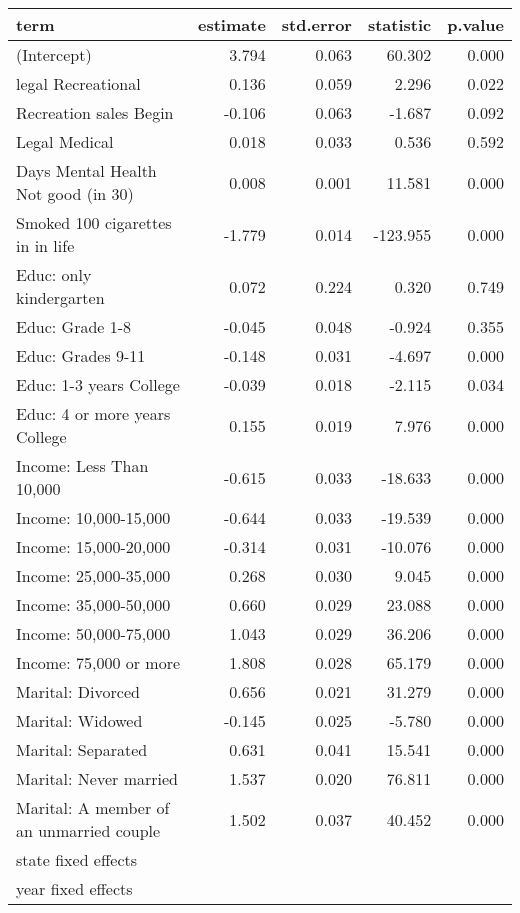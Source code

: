 \begin{tabular}{lrrrr}
  \hline
term & estimate & std.error & statistic & p.value \\ 
  \hline
(Intercept) & 3.794 & 0.063 & 60.302 & 0.000 \\ 
  legal Recreational & 0.136 & 0.059 & 2.296 & 0.022 \\ 
  Recreation sales Begin & -0.106 & 0.063 & -1.687 & 0.092 \\ 
  Legal Medical & 0.018 & 0.033 & 0.536 & 0.592 \\ 
  Days Mental Health Not good (in 30) & 0.008 & 0.001 & 11.581 & 0.000 \\ 
  Smoked 100 cigarettes in in life & -1.779 & 0.014 & -123.955 & 0.000 \\ 
  Educ: only kindergarten & 0.072 & 0.224 & 0.320 & 0.749 \\ 
  Educ: Grade 1-8 & -0.045 & 0.048 & -0.924 & 0.355 \\ 
  Educ: Grades 9-11 & -0.148 & 0.031 & -4.697 & 0.000 \\ 
  Educ: 1-3 years College & -0.039 & 0.018 & -2.115 & 0.034 \\ 
  Educ: 4 or more years College & 0.155 & 0.019 & 7.976 & 0.000 \\ 
  Income: Less Than 10,000 & -0.615 & 0.033 & -18.633 & 0.000 \\ 
  Income: 10,000-15,000 & -0.644 & 0.033 & -19.539 & 0.000 \\ 
  Income: 15,000-20,000 & -0.314 & 0.031 & -10.076 & 0.000 \\ 
  Income: 25,000-35,000 & 0.268 & 0.030 & 9.045 & 0.000 \\ 
  Income: 35,000-50,000 & 0.660 & 0.029 & 23.088 & 0.000 \\ 
  Income: 50,000-75,000 & 1.043 & 0.029 & 36.206 & 0.000 \\ 
  Income: 75,000 or more & 1.808 & 0.028 & 65.179 & 0.000 \\ 
  Marital: Divorced & 0.656 & 0.021 & 31.279 & 0.000 \\ 
  Marital: Widowed & -0.145 & 0.025 & -5.780 & 0.000 \\ 
  Marital: Separated & 0.631 & 0.041 & 15.541 & 0.000 \\ 
  Marital: Never married & 1.537 & 0.020 & 76.811 & 0.000 \\ 
  Marital: A member of an unmarried couple & 1.502 & 0.037 & 40.452 & 0.000 \\ 
  state fixed effects &  &  &  &  \\ 
  year fixed effects  &  &  &  &  \\ 
   \hline
\end{tabular}
